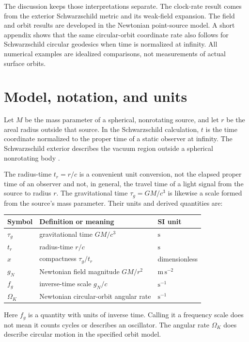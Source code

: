 \documentclass[12pt]{article}
\begin{document}
The discussion keeps those interpretations separate. The clock-rate result comes from the exterior Schwarzschild metric and its weak-field expansion. The field and orbit results are developed in the Newtonian point-source model. A short appendix shows that the same circular-orbit coordinate rate also follows for Schwarzschild circular geodesics when time is normalized at infinity. All numerical examples are idealized comparisons, not measurements of actual surface orbits.

\section{Model, notation, and units}
\label{sec:model}

Let $M$ be the mass parameter of a spherical, nonrotating source, and let $r$ be the areal radius outside that source. In the Schwarzschild calculation, $t$ is the time coordinate normalized to the proper time of a static observer at infinity. The Schwarzschild exterior describes the vacuum region outside a spherical nonrotating body \cite{TongGR}.

The radius-time $t_r=r/c$ is a convenient unit conversion, not the elapsed proper time of an observer and not, in general, the travel time of a light signal from the source to radius $r$. The gravitational time $\tau_g=GM/c^3$ is likewise a scale formed from the source's mass parameter. Their units and derived quantities are:
\begin{center}
\small
\begin{tabular}{@{}lll@{}}
  \toprule
  Symbol & Definition or meaning & SI unit \\
  \midrule
  $\tau_g$ & gravitational time $GM/c^3$ & $\mathrm{s}$ \\
  $t_r$ & radius-time $r/c$ & $\mathrm{s}$ \\
  $x$ & compactness $\tau_g/t_r$ & dimensionless \\
  $g_N$ & Newtonian field magnitude $GM/r^2$ & $\mathrm{m\,s^{-2}}$ \\
  $f_g$ & inverse-time scale $g_N/c$ & $\mathrm{s^{-1}}$ \\
  $\Omega_K$ & Newtonian circular-orbit angular rate & $\mathrm{s^{-1}}$ \\
  \bottomrule
\end{tabular}
\end{center}

Here $f_g$ is a quantity with units of inverse time. Calling it a frequency scale does not mean it counts cycles or describes an oscillator. The angular rate $\Omega_K$ does describe circular motion in the specified orbit model.
\end{document}
